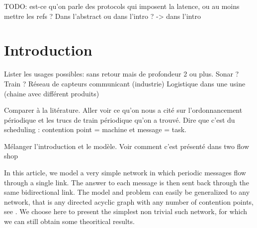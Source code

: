 \documentclass[10pt, conference, letterpaper]{IEEEtran}
\newcommand{\todo}[1]{{\color{red} TODO: {#1}}}
\begin{document}
\begin{abstract}

Cloud-RAN is a recent architecture for mobile networks where the processing units are located in 
 in distant data-centers while, until now, they were attached to antennas. The main challenge, to fulfill protocol time constraints, is to guarantee a low latency for the periodic messages sent from each antenna to its processing unit and back. The problem we address is to find a sending scheme of these periodic messages without contention nor buffering.

We focus on a simple but common star shaped topology, where all contentions are on a single arc shared by all antennas. For messages of arbitrary size, we show that there is always a solution as soon as the load of the network is less than $40\%$. Moreover, we explain how we can restrict our study to message of size $1$ without increasing too much the global latency. 

For message of size $1$, we prove that it is always possible to schedule them, when the load is less than $58\%$ \todo{tu m'a dis 63 au telephone non ? -> ça change tout le temps, je mettrais la vrai valeur quand j'aurai fini la preuve} using a polynomial time algorithm. Moreover, using a simple random greedy algorithm, we show that almost all
instances of a given load admit a solution, explaining why most greedy algorithms work so well in practice.  
\end{abstract}

\todo{est-ce qu'on parle des protocols qui imposent la latence, ou au moins mettre les refs ? Dans l'abstract ou dans l'intro ? -> dans l'intro}

\section{Introduction}

Lister les usages possibles: 
sans retour mais de profondeur 2 ou plus. Sonar ? Train ?
Réseau de capteurs communicant (industrie)
Logistique dans une usine (chaine avec différent produits)

Comparer à la litérature. Aller voir ce qu'on nous a cité sur l'ordonnancement périodique 
et les trucs de train périodique qu'on a trouvé.
Dire que c'est du scheduling : contention point = machine et message = task.


Mélanger l'introduction et le modèle. Voir comment c'est présenté dans two flow shop

In this article, we model a very simple network in which periodic messages flow through a single link. The answer to each message is then sent back through the same bidirectional link. The model and problem can easily be generalized to any network, that is any directed acyclic graph with any number of contention points, see \cite{dominique2018deterministic}. We choose here to present the simplest non trivial such network, for which we can still obtain some theoritical results. 
\end{document}
